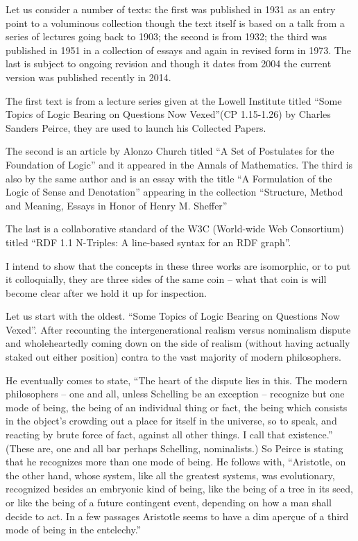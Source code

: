\documentclass[dah,phd,a4paper]{xe_uccthesis}
\begin{document}
Let us consider a number of texts: the first was published in 1931 as an entry point to a voluminous collection though the text itself is based on a talk from a series of lectures going back to 1903; the second is from 1932; the third was published in 1951 in a collection of essays and again in revised form in 1973. The last is subject to ongoing revision and though it dates from 2004 the current version was published recently in 2014.

	The first text is from a lecture series given at the Lowell Institute titled “Some Topics of Logic Bearing on Questions Now Vexed”(CP 1.15-1.26) by Charles Sanders Peirce, they are used to launch his Collected Papers.

	The second is an article by Alonzo Church titled “A Set of Postulates for the Foundation of Logic” and it appeared in the Annals of Mathematics. The third is also by the same author and is an essay with the title “A Formulation of the Logic of Sense and Denotation” appearing in the collection “Structure, Method and Meaning, Essays in Honor of Henry M. Sheffer”

	The last is a collaborative standard of the W3C (World-wide Web Consortium) titled “RDF 1.1 N-Triples: A line-based syntax for an RDF graph”.

	I intend to show that the concepts in these three works are isomorphic, or to put it colloquially, they are three sides of the same coin – what that coin is will become clear after we hold it up for inspection.

	Let us start with the oldest. “Some Topics of Logic Bearing on Questions Now Vexed”. After recounting the intergenerational realism versus nominalism dispute and wholeheartedly coming down on the side of realism (without having actually staked out either position) contra to the vast majority of modern philosophers.

	He eventually comes to state, “The heart of the dispute lies in this. The modern philosophers -- one and all, unless Schelling be an exception -- recognize but one mode of being, the being of an individual thing or fact, the being which consists in the object's crowding out a place for itself in the universe, so to speak, and reacting by brute force of fact, against all other things. I call that existence.” (These are, one and all bar perhaps Schelling, nominalists.) So Peirce is stating that he recognizes more than one mode of being. He follows with, “Aristotle, on the other hand, whose system, like all the greatest systems, was evolutionary, recognized besides an embryonic kind of being, like the being of a tree in its seed, or like the being of a future contingent event, depending on how a man shall decide to act. In a few passages Aristotle seems to have a dim aperçue of a third mode of being in the entelechy.”
\end{document}
